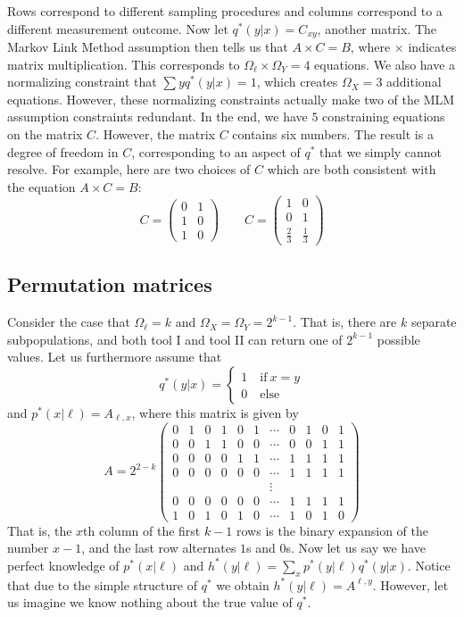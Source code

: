 Rows correspond to different sampling procedures and columns correspond to a different measurement outcome.  Now let $q^*(y|x)=C_{x y}$, another matrix.  The Markov Link Method assumption then tells us that $A\times C=B$, where $\times$ indicates matrix multiplication.  This corresponds to $\Omega_\ell \times \Omega_Y = 4$ equations.  We also have a normalizing constraint that $\sum y q^*(y|x)=1$, which creates $\Omega_X=3$ additional equations.  However, these normalizing constraints actually make two of the MLM assumption constraints redundant.  In the end, we have $5$ constraining equations on the matrix $C$.  However, the matrix $C$ contains six numbers.  The result is a degree of freedom in $C$, corresponding to an aspect of $q^*$ that we simply cannot resolve.  For example, here are two choices of $C$ which are both consistent with the equation $A\times C=B$:
\[
C=\left(\begin{array}{cc}
0 & 1\\
1 & 0\\
1 & 0
\end{array}\right)\qquad C=\left(\begin{array}{cc}
1 & 0\\
0 & 1\\
\frac{2}{3} & \frac{1}{3}
\end{array}\right)
\]



\subsection{Permutation matrices}

Consider the case that $\Omega_\ell = k$ and $\Omega_X=\Omega_Y=2^{k-1}$.  That is, there are $k$ separate subpopulations, and both tool I and tool II can return one of $2^{k-1}$ possible values.  Let us furthermore assume that
\[
q^*(y|x)=\begin{cases}1 \quad \mathrm{if}\ x=y\\0\quad \mathrm{else}\end{cases}
\]
and  $p^*(x|\ell)=A_{\ell,x}$, where this matrix is given by
\[
A=2^{2-k}\left(\begin{array}{ccccccccccc}
0 & 1 & 0 & 1 & 0 & 1 & \cdots & 0 & 1 & 0 & 1\\
0 & 0 & 1 & 1 & 0 & 0 & \cdots & 0 & 0 & 1 & 1\\
0 & 0 & 0 & 0 & 1 & 1 & \cdots & 1 & 1 & 1 & 1\\
0 & 0 & 0 & 0 & 0 & 0 & \cdots & 1 & 1 & 1 & 1\\
 &  &  &  &  &  & \vdots\\
0 & 0 & 0 & 0 & 0 & 0 & \cdots & 1 & 1 & 1 & 1\\
1 & 0 & 1 & 0 & 1 & 0 & \cdots & 1 & 0 & 1 & 0
\end{array}\right)
\]
That is, the $x$th column of the first $k-1$ rows is the binary expansion of the number $x-1$, and the last row alternates $1$s and $0$s.  Now let us say we have perfect knowledge of $p^*(x|\ell)$ and $h^*(y|\ell)=\sum_x p^*(y|\ell)q^*(y|x)$.  Notice that due to the simple structure of $q^*$ we obtain $h^*(y|\ell)=A^{\ell,y}$.  However, let us imagine we know nothing about the true value of $q^*$.  

